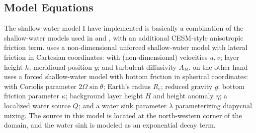 \subsection{Model Equations}
\label{sec:sw-equations}
The shallow-water model I have implemented is basically a combination of the shallow-water models used in \cite{killworth} and \cite{kawase}, with an additional \ac{CESM}-style anisotropic friction term. \citeauthor{killworth} uses a non-dimensional unforced shallow-water model with lateral friction in Cartesian coordinates:
%
%
with (non-dimensional) velocities \(u, v\); layer height \(h\); meridional position \(y\); and turbulent diffusivity \(A_H\). \citeauthor{kawase} on the other hand uses a forced shallow-water model with bottom friction in spherical coordinates:
%
%
with Coriolis parameter \(2\Omega \sin\theta\); Earth's radius \(R_e\); reduced gravity \(g\); bottom friction parameter \(\kappa\); background layer height \(H\) and height anomaly \(\eta\); a localized water source \(Q\); and a water sink parameter \(\lambda\) parameterizing diapycnal mixing. The source in this model is located at the north-western corner of the domain, and the water sink is modeled as an exponential decay term.


